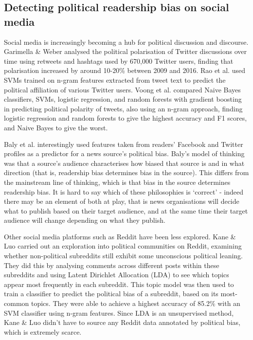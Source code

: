 \subsection{Detecting political readership bias on social media} \label{subsec:readership-bias-social-media}

Social media is increasingly becoming a hub for political discussion and discourse. Garimella \& Weber \cite{garimella} analysed the political polarisation of Twitter discussions over time using retweets and hashtags used by 670,000 Twitter users, finding that polarisation increased by around 10-20\% between 2009 and 2016. Rao et al. \cite{rao} used SVMs trained on n-gram features extracted from tweet text to predict the political affiliation of various Twitter users. Voong et al. \cite{voong} compared Naive Bayes classifiers, SVMs, logistic regression, and random forests with gradient boosting in predicting political polarity of tweets, also using an n-gram approach, finding logistic regression and random forests to give the highest accuracy and F1 scores, and Naive Bayes to give the worst.

Baly et al. \cite{baly-acl2020} interestingly used features taken from readers' Facebook and Twitter profiles as a predictor for a news source's political bias. Baly's model of thinking was that a source's audience characterises how biased that source is and in what direction (that is, readership bias determines bias in the source). This differs from the mainstream line of thinking, which is that bias in the source determines readership bias. It is hard to say which of these philosophies is `correct' - indeed there may be an element of both at play, that is news organisations will decide what to publish based on their target audience, and at the same time their target audience will change depending on what they publish.

Other social media platforms such as Reddit have been less explored. Kane \& Luo \cite{kane} carried out an exploration into political communities on Reddit, examining whether non-political subreddits still exhibit some unconscious political leaning. They did this by analysing comments across different posts within these subreddits and using Latent Dirichlet Allocation (LDA) to see which topics appear most frequently in each subreddit. This topic model was then used to train a classifier to predict the political bias of a subreddit, based on its most-common topics. They were able to achieve a highest accuracy of 85.2\% with an SVM classifier using n-gram features. Since LDA is an unsupervised method, Kane \& Luo didn't have to source any Reddit data annotated by political bias, which is extremely scarce.

